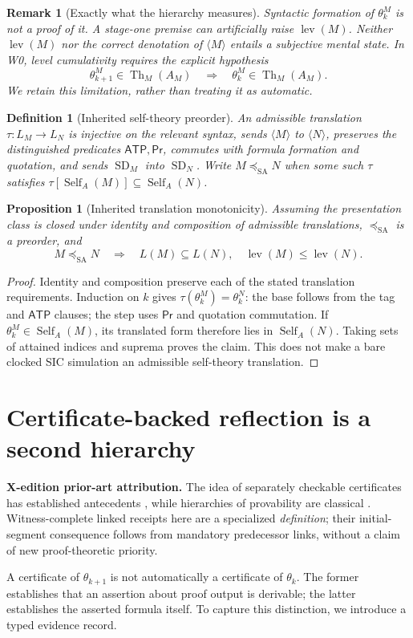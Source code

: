 \documentclass[11pt,letterpaper]{article}
\newcommand{\PriorArtNote}[1]{%
\par\smallskip\noindent\begin{minipage}{\linewidth}\small\color{black!85}%
\textbf{X-edition prior-art attribution.} #1\end{minipage}\par\smallskip}
\newtheorem{proposition}[theorem]{Proposition}
\newtheorem{definition}[theorem]{Definition}
\newtheorem{remark}[theorem]{Remark}
\newcommand{\thmset}{\operatorname{Th}}
\newcommand{\Self}{\operatorname{Self}}
\newcommand{\SD}{\operatorname{SD}}
\newcommand{\Prv}{\mathsf{Pr}}
\newcommand{\ATP}{\mathsf{ATP}}
\newcommand{\lev}{\operatorname{lev}}
\begin{document}
\begin{remark}[Exactly what the hierarchy measures]
Syntactic formation of $\theta_k^M$ is not a proof of it. A stage-one premise can artificially raise $\lev(M)$. Neither $\lev(M)$ nor the correct denotation of $\langle M\rangle$ entails a subjective mental state. In W0, level cumulativity requires the explicit hypothesis
\[
\theta^M_{k+1}\in\thmset_M(A_M)\quad\Longrightarrow\quad
\theta^M_k\in\thmset_M(A_M).
\]
We retain this limitation, rather than treating it as automatic.
\end{remark}

\begin{definition}[Inherited self-theory preorder]
An \emph{admissible translation} $\tau:L_M\to L_N$ is injective on the relevant syntax, sends $\langle M\rangle$ to $\langle N\rangle$, preserves the distinguished predicates $\ATP,\Prv$, commutes with formula formation and quotation, and sends $\SD_M$ into $\SD_N$. Write $M\preceq_{\mathrm{SA}}N$ when some such $\tau$ satisfies $\tau[\Self_A(M)]\subseteq\Self_A(N)$.
\end{definition}
\begin{proposition}[Inherited translation monotonicity]
Assuming the presentation class is closed under identity and composition of admissible translations, $\preceq_{\mathrm{SA}}$ is a preorder, and
\[
 M\preceq_{\mathrm{SA}}N\quad\Longrightarrow\quad L(M)\subseteq L(N),\quad\lev(M)\le\lev(N).
\]
\end{proposition}
\begin{proof}
Identity and composition preserve each of the stated translation requirements. Induction on $k$ gives $\tau(\theta_k^M)=\theta_k^N$: the base follows from the tag and $\ATP$ clauses; the step uses $\Prv$ and quotation commutation. If $\theta_k^M\in\Self_A(M)$, its translated form therefore lies in $\Self_A(N)$. Taking sets of attained indices and suprema proves the claim. This does not make a bare clocked SIC simulation an admissible self-theory translation.
\end{proof}

\section{Certificate-backed reflection is a second hierarchy}
\PriorArtNote{The idea of separately checkable certificates has established antecedents \cite{necula,besson}, while hierarchies of provability are classical \cite{lob,feferman}. Witness-complete linked receipts here are a specialized \emph{definition}; their initial-segment consequence follows from mandatory predecessor links, without a claim of new proof-theoretic priority.}
A certificate of $\theta_{k+1}$ is not automatically a certificate of $\theta_k$. The former establishes that an assertion about proof output is derivable; the latter establishes the asserted formula itself. To capture this distinction, we introduce a typed evidence record.
\end{document}
